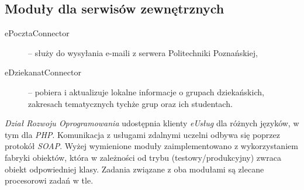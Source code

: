 \subsection{Moduły dla serwisów zewnętrznych}
\begin{description}
\item[ePocztaConnector] -- służy do wysyłania e-maili z serwera Politechniki Poznańskiej,
\item[eDziekanatConnector] -- pobiera i aktualizuje lokalne informacje o grupach dziekańskich, zakresach tematycznych tychże grup oraz ich studentach.
\end{description}

\textit{Dział Rozwoju Oprogramowania} udostępnia klienty \textit{eUsług} dla różnych języków, w tym dla \emph{PHP}. Komunikacja z usługami zdalnymi uczelni odbywa się poprzez protokół \textit{SOAP}. Wyżej wymienione moduły zaimplementowano z wykorzystaniem fabryki obiektów, która w zależności od trybu (testowy\slash produkcyjny) zwraca obiekt odpowiedniej klasy. Zadania związane z oba modułami są zlecane procesorowi zadań w tle.